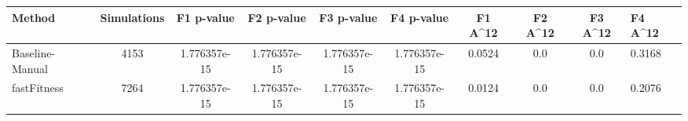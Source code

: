 \begin{tabular}{lcccccccc}
\toprule
         Method &  Simulations &   F1 p-value &   F2 p-value &   F3 p-value &   F4 p-value &  F1 A^12 &  F2 A^12 &  F3 A^12 &  F4 A^12 \\
\midrule
Baseline-Manual &         4153 & 1.776357e-15 & 1.776357e-15 & 1.776357e-15 & 1.776357e-15 &   0.0524 &      0.0 &      0.0 &   0.3168 \\
    fastFitness &         7264 & 1.776357e-15 & 1.776357e-15 & 1.776357e-15 & 1.776357e-15 &   0.0124 &      0.0 &      0.0 &   0.2076 \\
\bottomrule
\end{tabular}
